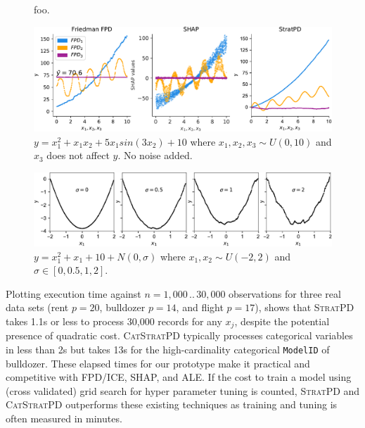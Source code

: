 \documentclass{article}
\newcommand{\spd}{\fontfamily{cmr}\textsc{\small StratPD}}
\newcommand{\cspd}{\fontfamily{cmr}\textsc{\small CatStratPD}}
\begin{document}
\begin{figure}[htbp]
\begin{center}
\caption{\small foo.}
\label{fig:pregnant}
\end{center}
\end{figure}

\begin{figure}[htbp]
\begin{center}
\includegraphics[scale=0.4]{images/interactions.pdf}
\caption{\small $y = x_1^2 + x_1 x_2 + 5 x_1 sin(3 x_2) + 10$ where $x_1,x_2,x_3 \sim U(0,10)$ and $x_3$ does not affect $y$. No noise added.}
\label{fig:interactions}
\end{center}
\end{figure}

\begin{figure}[htbp]
\begin{center}
\includegraphics[scale=0.4]{images/noise.pdf}
\caption{\small $y = x_1^2 + x_1 + 10 + N(0,\sigma)$ where $x_1,x_2 \sim U(-2,2)$ and $\sigma \in [0,0.5,1,2]$.}
\label{fig:noise}
\end{center}
\end{figure}

Plotting execution time against $n=1,000\, ..\, 30,000$ observations for three real data sets (rent $p=20$, bulldozer $p=14$, and flight $p=17$), shows that \spd{} takes 1.1s or less to process 30,000 records for any $x_j$, despite the potential presence of quadratic cost. \cspd{} typically processes categorical variables in less than 2s but takes 13s for the high-cardinality categorical {\tt\small ModelID} of bulldozer.  These elapsed times for our prototype make it practical and  competitive with FPD/ICE, SHAP, and ALE.   If the cost to train a model using (cross validated) grid search for hyper parameter tuning is counted, \spd{} and \cspd{} outperforms these existing techniques as training and tuning is often measured in minutes. 
\end{document}
